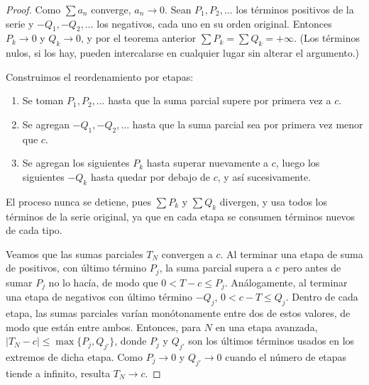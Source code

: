 \begin{proof}
  Como \(\sum a_n\) converge, \(a_n \to 0\). Sean \(P_1, P_2, \dots\) los términos positivos de la serie y \(-Q_1, -Q_2, \dots\) los negativos, cada uno en su orden original. Entonces \(P_k \to 0\) y \(Q_k \to 0\), y por el teorema anterior \(\sum P_k = \sum Q_k = +\infty\). (Los términos nulos, si los hay, pueden intercalarse en cualquier lugar sin alterar el argumento.)

  Construimos el reordenamiento por etapas:
  \begin{enumerate}[label=(\arabic*)]
    \item Se toman \(P_1, P_2, \dots\) hasta que la suma parcial supere por primera vez a \(c\).
    \item Se agregan \(-Q_1, -Q_2, \dots\) hasta que la suma parcial sea por primera vez menor que \(c\).
    \item Se agregan los siguientes \(P_k\) hasta superar nuevamente a \(c\), luego los siguientes \(-Q_k\) hasta quedar por debajo de \(c\), y así sucesivamente.
  \end{enumerate}
  El proceso nunca se detiene, pues \(\sum P_k\) y \(\sum Q_k\) divergen, y usa todos los términos de la serie original, ya que en cada etapa se consumen términos nuevos de cada tipo.

  Veamos que las sumas parciales \(T_N\) convergen a \(c\). Al terminar una etapa de suma de positivos, con último término \(P_j\), la suma parcial supera a \(c\) pero antes de sumar \(P_j\) no lo hacía, de modo que \(0 < T - c \leq P_j\). Análogamente, al terminar una etapa de negativos con último término \(-Q_j\), \(0 < c - T \leq Q_j\). Dentro de cada etapa, las sumas parciales varían monótonamente entre dos de estos valores, de modo que están entre ambos. Entonces, para \(N\) en una etapa avanzada, \(|T_N - c| \leq \max\{P_j, Q_{j'}\}\), donde \(P_j\) y \(Q_{j'}\) son los últimos términos usados en los extremos de dicha etapa. Como \(P_j \to 0\) y \(Q_{j'} \to 0\) cuando el número de etapas tiende a infinito, resulta \(T_N \to c\).
\end{proof}
